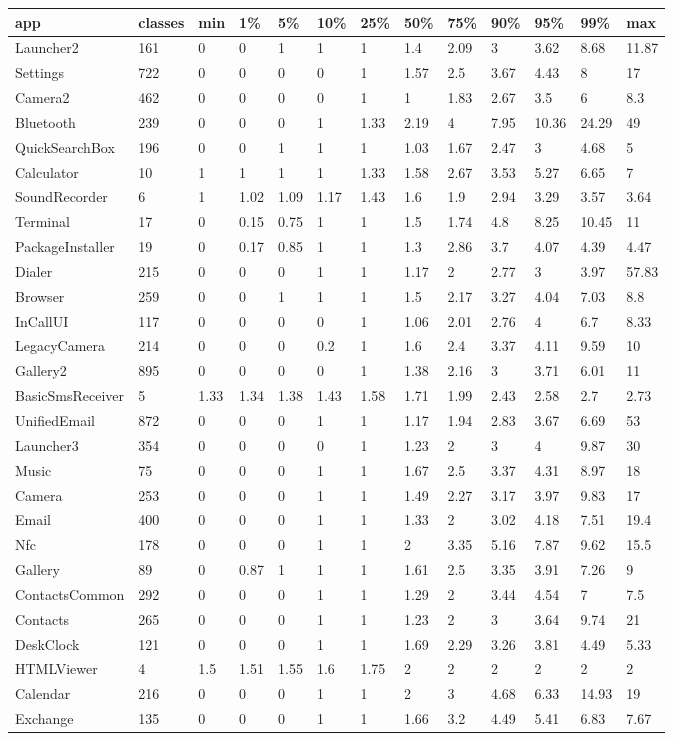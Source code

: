 \begin{tabular}{|l|l|l|l|l|l|l|l|l|l|l|l|l|}
\hline
app&classes&min&1\%&5\%&10\%&25\%&50\%&75\%&90\%&95\%&99\%&max\\
\hline
Launcher2&161&0&0&1&1&1&1.4&2.09&3&3.62&8.68&11.87\\
\hline
Settings&722&0&0&0&0&1&1.57&2.5&3.67&4.43&8&17\\
\hline
Camera2&462&0&0&0&0&1&1&1.83&2.67&3.5&6&8.3\\
\hline
Bluetooth&239&0&0&0&1&1.33&2.19&4&7.95&10.36&24.29&49\\
\hline
QuickSearchBox&196&0&0&1&1&1&1.03&1.67&2.47&3&4.68&5\\
\hline
Calculator&10&1&1&1&1&1.33&1.58&2.67&3.53&5.27&6.65&7\\
\hline
SoundRecorder&6&1&1.02&1.09&1.17&1.43&1.6&1.9&2.94&3.29&3.57&3.64\\
\hline
Terminal&17&0&0.15&0.75&1&1&1.5&1.74&4.8&8.25&10.45&11\\
\hline
PackageInstaller&19&0&0.17&0.85&1&1&1.3&2.86&3.7&4.07&4.39&4.47\\
\hline
Dialer&215&0&0&0&1&1&1.17&2&2.77&3&3.97&57.83\\
\hline
Browser&259&0&0&1&1&1&1.5&2.17&3.27&4.04&7.03&8.8\\
\hline
InCallUI&117&0&0&0&0&1&1.06&2.01&2.76&4&6.7&8.33\\
\hline
LegacyCamera&214&0&0&0&0.2&1&1.6&2.4&3.37&4.11&9.59&10\\
\hline
Gallery2&895&0&0&0&0&1&1.38&2.16&3&3.71&6.01&11\\
\hline
BasicSmsReceiver&5&1.33&1.34&1.38&1.43&1.58&1.71&1.99&2.43&2.58&2.7&2.73\\
\hline
UnifiedEmail&872&0&0&0&1&1&1.17&1.94&2.83&3.67&6.69&53\\
\hline
Launcher3&354&0&0&0&0&1&1.23&2&3&4&9.87&30\\
\hline
Music&75&0&0&0&1&1&1.67&2.5&3.37&4.31&8.97&18\\
\hline
Camera&253&0&0&0&1&1&1.49&2.27&3.17&3.97&9.83&17\\
\hline
Email&400&0&0&0&1&1&1.33&2&3.02&4.18&7.51&19.4\\
\hline
Nfc&178&0&0&0&1&1&2&3.35&5.16&7.87&9.62&15.5\\
\hline
Gallery&89&0&0.87&1&1&1&1.61&2.5&3.35&3.91&7.26&9\\
\hline
ContactsCommon&292&0&0&0&1&1&1.29&2&3.44&4.54&7&7.5\\
\hline
Contacts&265&0&0&0&1&1&1.23&2&3&3.64&9.74&21\\
\hline
DeskClock&121&0&0&0&1&1&1.69&2.29&3.26&3.81&4.49&5.33\\
\hline
HTMLViewer&4&1.5&1.51&1.55&1.6&1.75&2&2&2&2&2&2\\
\hline
Calendar&216&0&0&0&1&1&2&3&4.68&6.33&14.93&19\\
\hline
Exchange&135&0&0&0&1&1&1.66&3.2&4.49&5.41&6.83&7.67\\
\hline
\end{tabular}
